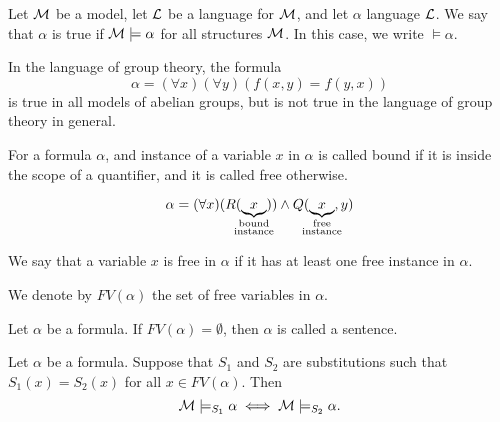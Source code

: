 \documentclass[11pt,a4paper]{article}
\begin{document}
  \begin{definition}
    Let $\mathcal{M}$ be a model, let $\mathcal{L}$ be a language for $\mathcal{M}$, 
    and let $\alpha$ language $\mathcal{L}$.
    We say that $\alpha$ is true if $\mathcal{M} \models \alpha$ for all
    structures $\mathcal{M}$.
    In this case, we write $\models \alpha$.
  \end{definition}

  \begin{example}
    In the language of group theory, the formula
    \[
      \alpha = (\forall x)(\forall y)(f(x,y) = f(y,x))
    \]
    is true in all models of abelian groups, but is not true in the language
    of group theory in general.
  \end{example}

  \begin{definition}
    For a formula $\alpha$, and instance of a variable $x$ in $\alpha$
    is called bound if it is inside the scope of a quantifier, and it is called
    free otherwise.
  \end{definition}

  \begin{example}
    \[
      \alpha = (\forall x)(R(\underbrace{x}_{\mathclap{
      \substack{\text{bound} \\ \text{instance}}}})) 
      \land Q(\underbrace{x}_{\mathclap{
      \substack{\text{free} \\ \text{instance}}}},y)
    \]
  \end{example}

  \begin{definition}
    We say that a variable $x$ is free in $\alpha$ if it has at least one 
    free instance in $\alpha$.
  \end{definition}
  \begin{remark}
    We denote by $FV(\alpha)$ the set of free variables in $\alpha$.
  \end{remark}

  \begin{definition}[Sentence]
    Let $\alpha$ be a formula.
    If $FV(\alpha) = \emptyset$, then $\alpha$ is called a sentence.
  \end{definition}

  \begin{proposition}
    Let $\alpha$ be a formula.
    Suppose that $S_1$ and $S_2$ are substitutions such that $S_1(x) = S_2(x)$
    for all $x \in FV(\alpha)$.
    Then
    \[
      \mathcal{M} \models_{S_1} \alpha \iff
      \mathcal{M} \models_{S_2} \alpha.
    \]
  \end{proposition}
\end{document}
